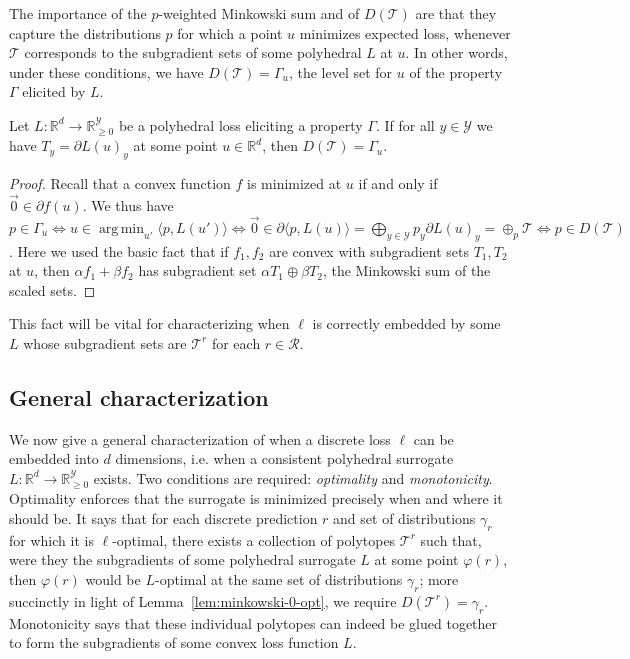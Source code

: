 \documentclass[anon]{colt2020} %
\newcommand{\reals}{\mathbb{R}}
\newcommand{\nonnegreals}{\reals_{\geq 0}}%
\newcommand{\R}{\mathcal{R}}
\newcommand{\T}{\mathcal{T}}
\newcommand{\Y}{\mathcal{Y}}
\newcommand{\inprod}[2]{\langle #1, #2 \rangle}%
\DeclareMathOperator*{\argmin}{arg\,min}
\begin{document}
The importance of the $p$-weighted Minkowski sum and of $D(\T)$ are that they capture the distributions $p$ for which a point $u$ minimizes expected loss, whenever $\T$ corresponds to the subgradient sets of some polyhedral $L$ at $u$.
In other words, under these conditions, we have $D(\T) = \Gamma_u$, the level set for $u$ of the property $\Gamma$ elicited by $L$.
\begin{lemma} \label{lem:minkowski-0-opt}
  Let $L: \reals^d \to \nonnegreals^{\Y}$ be a polyhedral loss eliciting a property $\Gamma$.
  If for all $y\in\Y$ we have $T_y = \partial L(u)_y$ at some point $u\in\reals^d$, then $D(\T) = \Gamma_u$.
\end{lemma}
\begin{proof}
  Recall that a convex function $f$ is minimized at $u$ if and only if $\vec 0 \in \partial f(u)$.
  We thus have $p\in\Gamma_u \iff u \in \argmin_{u'} \inprod{p}{L(u')} \iff \vec 0 \in \partial\inprod{p}{L(u)} = \mathop{\bigoplus}_{y\in\Y} p_y \partial L(u)_y = \oplus_p \T \iff p\in D(\T)$.
  Here we used the basic fact that if $f_1,f_2$ are convex with subgradient sets $T_1,T_2$ at $u$, then $\alpha f_1 + \beta f_2$ has subgradient set $\alpha T_1 \oplus \beta T_2$, the Minkowski sum of the scaled sets.
\end{proof}
This fact will be vital for characterizing when $\ell$ is correctly embedded by some $L$ whose subgradient sets are $\T^r$ for each $r \in \R$.

\subsection{General characterization}
\label{subsec:gener-char}

We now give a general characterization of when a discrete loss $\ell$ can be embedded into $d$ dimensions, i.e. when a consistent polyhedral surrogate $L: \reals^d \to \reals^{\Y}_{\geq 0}$ exists.
Two conditions are required: \emph{optimality} and \emph{monotonicity}.
Optimality enforces that the surrogate is minimized precisely when and where it should be.
It says that for each discrete prediction $r$ and set of distributions $\gamma_r$ for which it is $\ell$-optimal, there exists a collection of polytopes $\T^r$ such that, were they the subgradients of some polyhedral surrogate $L$ at some point $\varphi(r)$, then $\varphi(r)$ would be $L$-optimal at the same set of distributions $\gamma_r$; more succinctly in light of Lemma~\ref{lem:minkowski-0-opt}, we require $D(\T^r)=\gamma_r$.
Monotonicity says that these individual polytopes can indeed be glued together to form the subgradients of some convex loss function $L$.
\end{document}
